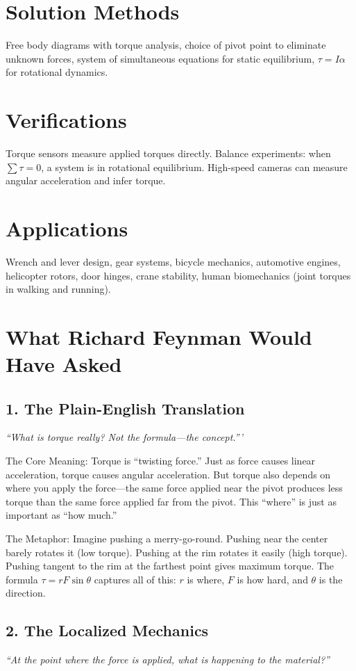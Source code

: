 \section*{Solution Methods}

Free body diagrams with torque analysis, choice of pivot point to eliminate unknown forces, system of simultaneous equations for static equilibrium, $\tau = I\alpha$ for rotational dynamics.
\section*{Verifications}

Torque sensors measure applied torques directly. Balance experiments: when $\sum \tau = 0$, a system is in rotational equilibrium. High-speed cameras can measure angular acceleration and infer torque.
\section*{Applications}

Wrench and lever design, gear systems, bicycle mechanics, automotive engines, helicopter rotors, door hinges, crane stability, human biomechanics (joint torques in walking and running).
\section*{What Richard Feynman Would Have Asked}

\subsection*{1. The Plain-English Translation}
\textit{``What is torque really? Not the formula---the concept.'''}

The Core Meaning: Torque is ``twisting force.'' Just as force causes linear acceleration, torque causes angular acceleration. But torque also depends on where you apply the force---the same force applied near the pivot produces less torque than the same force applied far from the pivot. This ``where'' is just as important as ``how much.''

The Metaphor: Imagine pushing a merry-go-round. Pushing near the center barely rotates it (low torque). Pushing at the rim rotates it easily (high torque). Pushing tangent to the rim at the farthest point gives maximum torque. The formula $\tau = rF\sin\theta$ captures all of this: $r$ is where, $F$ is how hard, and $\theta$ is the direction.

\subsection*{2. The Localized Mechanics}
\textit{``At the point where the force is applied, what is happening to the material?''}

